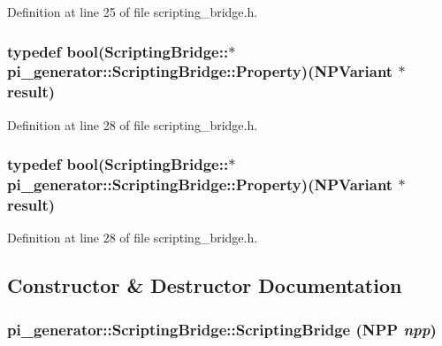 Definition at line 25 of file scripting\_\-bridge.h.

\hypertarget{classpi__generator_1_1_scripting_bridge_abcd8cffa7f26f348e68cde316038245f}{
\subsubsection[{Property}]{\setlength{\rightskip}{0pt plus 5cm}typedef bool(ScriptingBridge::$\ast$ {\bf pi\_\-generator::ScriptingBridge::Property})(NPVariant $\ast$result)}}
\label{classpi__generator_1_1_scripting_bridge_abcd8cffa7f26f348e68cde316038245f}


Definition at line 28 of file scripting\_\-bridge.h.

\hypertarget{classpi__generator_1_1_scripting_bridge_abcd8cffa7f26f348e68cde316038245f}{
\subsubsection[{Property}]{\setlength{\rightskip}{0pt plus 5cm}typedef bool(ScriptingBridge::$\ast$ {\bf pi\_\-generator::ScriptingBridge::Property})(NPVariant $\ast$result)}}
\label{classpi__generator_1_1_scripting_bridge_abcd8cffa7f26f348e68cde316038245f}


Definition at line 28 of file scripting\_\-bridge.h.



\subsection{Constructor \& Destructor Documentation}
\hypertarget{classpi__generator_1_1_scripting_bridge_abcc778b6a4c482dff1ed271d7e776e42}{
\subsubsection[{ScriptingBridge}]{\setlength{\rightskip}{0pt plus 5cm}pi\_\-generator::ScriptingBridge::ScriptingBridge (NPP {\em npp})}}
\label{classpi__generator_1_1_scripting_bridge_abcc778b6a4c482dff1ed271d7e776e42}


